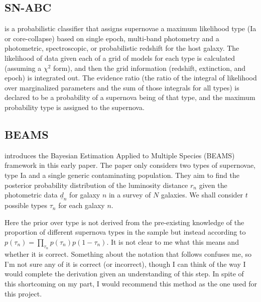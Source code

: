 \documentclass[12pt, onecolumn]{emulateapj}
\newcommand{\textul}{\underline}
\begin{document}
\subsection{SN-ABC}

\citet{Poznanski06} is a probabilistic classifier that assigns supernovae a maximum likelihood type (Ia or core-collapse) based on single epoch, multi-band photometry and a photometric, spectroscopic, or probabilistic redshift for the host galaxy.  The likelihood of data given each of a grid of models for each type is calculated (assuming a $\chi^{2}$ form), and then the grid information (redshift, extinction, and epoch) is integrated out.  The evidence ratio (the ratio of the integral of likelihood over marginalized parameters and the sum of those integrals for all types) is declared to be a probability of a supernova being of that type, and the maximum probability type is assigned to the supernova.

\subsection{BEAMS}

\citet{Kunz07} introduces the Bayesian Estimation Applied to Multiple Species (BEAMS) framework in this early paper.  The paper only considers two types of supernovae, type Ia and a single generic contaminating population.  They aim to find the posterior probability distribution of the luminosity distance $r_{n}$ given the photometric data $\textul{d}_{n}$ for galaxy $n$ in a survey of $N$ galaxies.  We shall consider $t$ possible types $\tau_{n}$ for each galaxy $n$.
%

Here the prior over type is not derived from the pre-existing knowledge of the proportion of different supernova types in the sample but instead according to $p(\tau_{n})=\prod_{\tau_{n}}p(\tau_{n})p(1-\tau_{n})$.  It is not clear to me what this means and whether it is correct.  Something about the notation that follows confuses me, so I'm not sure any of it is correct (or incorrect), though I can think of the way I would complete the derivation given an understanding of this step.  In spite of this shortcoming on my part, I would recommend this method as the one used for this project.
\end{document}

